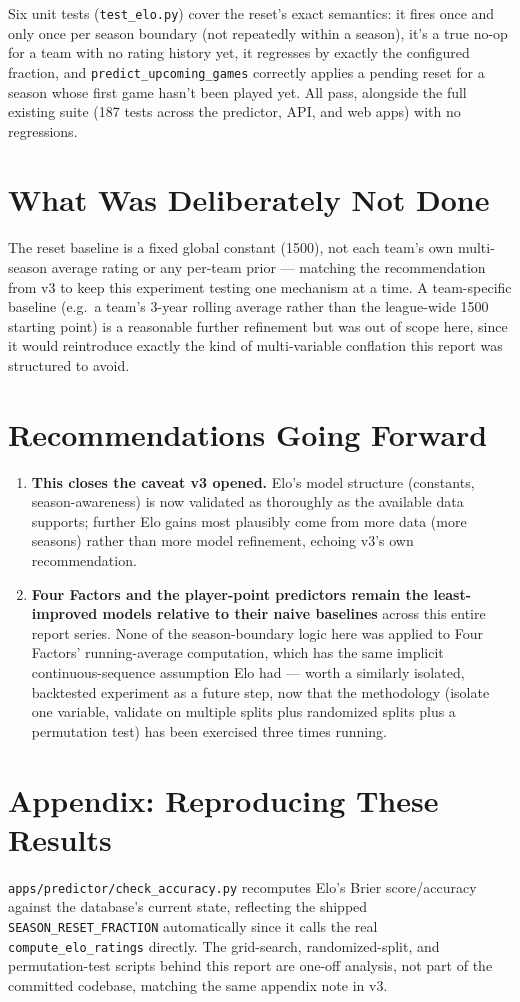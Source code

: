 \documentclass[11pt]{article}
\newcommand{\code}[1]{\allowbreak\texttt{\small #1}\allowbreak}
\begin{document}
Six unit tests (\code{test\_elo.py}) cover the reset's exact semantics: it fires once and only once per
season boundary (not repeatedly within a season), it's a true no-op for a team with no rating history yet, it
regresses by exactly the configured fraction, and \code{predict\_upcoming\_games} correctly applies a pending
reset for a season whose first game hasn't been played yet. All pass, alongside the full existing suite
(187 tests across the predictor, API, and web apps) with no regressions.

\section{What Was Deliberately Not Done}

The reset baseline is a fixed global constant (1500), not each team's own multi-season average rating or any
per-team prior — matching the recommendation from v3 to keep this experiment testing one mechanism at a time.
A team-specific baseline (e.g.\ a team's 3-year rolling average rather than the league-wide 1500 starting
point) is a reasonable further refinement but was out of scope here, since it would reintroduce exactly the
kind of multi-variable conflation this report was structured to avoid.

\section{Recommendations Going Forward}

\begin{enumerate}
    \item \textbf{This closes the caveat v3 opened.} Elo's model structure (constants, season-awareness) is
    now validated as thoroughly as the available data supports; further Elo gains most plausibly come from
    more data (more seasons) rather than more model refinement, echoing v3's own recommendation.
    \item \textbf{Four Factors and the player-point predictors remain the least-improved models relative to
    their naive baselines} across this entire report series. None of the season-boundary logic here was
    applied to Four Factors' running-average computation, which has the same implicit continuous-sequence
    assumption Elo had — worth a similarly isolated, backtested experiment as a future step, now that the
    methodology (isolate one variable, validate on multiple splits plus randomized splits plus a permutation
    test) has been exercised three times running.
\end{enumerate}

\section*{Appendix: Reproducing These Results}

\code{apps/predictor/check\_accuracy.py} recomputes Elo's Brier score/accuracy against the database's current
state, reflecting the shipped \code{SEASON\_RESET\_FRACTION} automatically since it calls the real
\code{compute\_elo\_ratings} directly. The grid-search, randomized-split, and permutation-test scripts behind
this report are one-off analysis, not part of the committed codebase, matching the same appendix note in v3.
\end{document}
